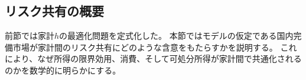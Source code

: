 
\subsection{リスク共有の概要}
\label{sec:chapter3_risk_sharing_overview}
前節では家計\(h\)の最適化問題を定式化した。
本節ではモデルの仮定である国内完備市場が家計間のリスク共有にどのような含意をもたらすかを説明する。
これにより、なぜ所得の限界効用、消費、そして可処分所得が家計間で共通化されるのかを数学的に明らかにする。